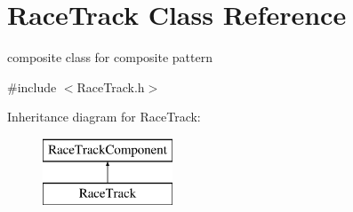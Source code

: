 \hypertarget{class_race_track}{}\section{Race\+Track Class Reference}
\label{class_race_track}


composite class for composite pattern  




{\ttfamily \#include $<$Race\+Track.\+h$>$}

Inheritance diagram for Race\+Track\+:\begin{figure}[H]
\begin{center}
\leavevmode
\includegraphics[height=2.000000cm]{class_race_track}
\end{center}
\end{figure}
